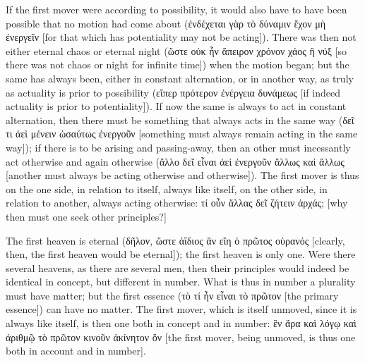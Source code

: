 \documentclass[12pt]{book}
\begin{document}
If the first mover were according to possibility, it would also have to have been possible that no
motion had come about (ἐνδέχεται γὰρ τὸ δύναμιν ἔχον μὴ ἐνεργεῖν [for that which has potentiality
may not be acting]). There was then not either eternal chaos or eternal night (ὥστε οὐκ ἦν ἄπειρον
χρόνον χάος ἢ νύξ [so there was not chaos or night for infinite time]) when the motion began; but
the same has always been, either in constant alternation, or in another way, as truly as actuality
is prior to possibility (εἴπερ πρότερον ἐνέργεια δυνάμεως [if indeed actuality is prior to
potentiality]). If now the same is always to act in constant alternation, then there must be
something that always acts in the same way (δεῖ τι ἀεὶ μένειν ὡσαύτως ἐνεργοῦν [something must
always remain acting in the same way]); if there is to be arising and passing-away, then an other
must incessantly act
otherwise and again otherwise (ἄλλο δεῖ εἶναι ἀεὶ ἐνεργοῦν ἄλλως καὶ ἄλλως [another must always be
acting otherwise and otherwise]). The first mover is thus on the one side, in relation to itself,
always like itself, on the other side, in relation to another, always acting otherwise: τί οὖν
ἄλλας δεῖ ζήτειν ἀρχάς; [why then must one seek other principles?]

The first heaven is eternal (δῆλον, ὥστε ἀΐδιος ἂν εἴη ὁ πρῶτος οὐρανός [clearly, then, the first
heaven would be eternal]); the first heaven is only one. Were there several heavens, as there are
several men, then their principles would indeed be identical in concept, but different in number.
What is thus in number a plurality must have matter; but the first essence (τὸ τί ἦν εἶναι τὸ
πρῶτον [the primary essence]) can have no matter. The first mover, which is itself unmoved, since it
is always like itself, is then one both in concept and in number: ἓν ἄρα καὶ λόγῳ καὶ ἀριθμῷ τὸ
πρῶτον κινοῦν ἀκίνητον ὄν [the first mover, being unmoved, is thus one both in account and in
number].
\end{document}
